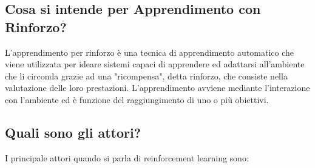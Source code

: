 \documentclass[\main/main.tex]{subfiles}
\begin{document}
\subsection{Cosa si intende per Apprendimento con Rinforzo?}
L'apprendimento per rinforzo è una tecnica di apprendimento automatico che viene utilizzata per ideare sistemi capaci di apprendere ed adattarsi all'ambiente che li circonda grazie ad una "ricompensa", detta rinforzo, che consiste nella valutazione delle loro prestazioni. L'apprendimento avviene mediante l'interazione con l'ambiente ed è funzione del raggiungimento di uno o più obiettivi.

\subsection{Quali sono gli attori?}
I principale attori quando si parla di reinforcement learning sono:
\end{document}
